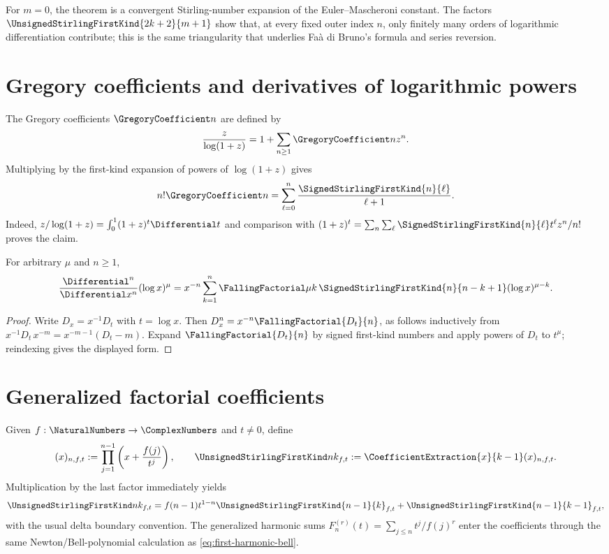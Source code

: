\documentclass[11pt,a4paper,oneside,openany]{book}
\theoremstyle{definition}
\theoremstyle{remark}
\begin{document}
For $m=0$, the theorem is a convergent Stirling-number expansion of the
Euler--Mascheroni constant.  The factors
$\UnsignedStirlingFirstKind{2k+2}{m+1}$ show that, at every fixed outer index $n$, only finitely many
orders of logarithmic differentiation contribute; this is the same triangularity
that underlies Fa\`a di Bruno's formula and series reversion.
\section{Gregory coefficients and derivatives of logarithmic powers}
The Gregory coefficients $\GregoryCoefficient n$ are defined by
\[
 \frac{z}{\log(1+z)}=1+\sum_{n\ge1}\GregoryCoefficient n z^n.
\]
Multiplying by the first-kind expansion of powers of $\log(1+z)$ gives
\begin{equation}\label{eq:gregory-stirling}
 n!\GregoryCoefficient n=\sum_{\ell=0}^n\frac{\SignedStirlingFirstKind{n}{\ell}}{\ell+1}.
\end{equation}
Indeed,
$z/\log(1+z)=\int_0^1(1+z)^t\Differential t$ and comparison with
$(1+z)^t=\sum_n\sum_\ell \SignedStirlingFirstKind{n}{\ell}t^\ell z^n/n!$ proves the claim.

For arbitrary $\mu$ and $n\ge1$,
\begin{equation}\label{eq:log-power-derivative}
 \frac{\Differential^n}{\Differential x^n}(\log x)^\mu
 =x^{-n}\sum_{k=1}^n\FallingFactorial\mu k\,\SignedStirlingFirstKind{n}{n-k+1}(\log x)^{\mu-k}.
\end{equation}
\begin{proof}
Write $D_x=x^{-1}D_t$ with $t=\log x$.  Then
$D_x^n=x^{-n}\FallingFactorial{D_t}{n}$, as follows inductively from
$x^{-1}D_t\,x^{-m}=x^{-m-1}(D_t-m)$.  Expand
$\FallingFactorial{D_t}{n}$ by signed first-kind numbers and apply powers of $D_t$ to
$t^\mu$; reindexing gives the displayed form.
\end{proof}

\section{Generalized factorial coefficients}
Given $f:\NaturalNumbers\to\ComplexNumbers$ and $t\ne0$, define
\begin{equation}\label{eq:generalized-factorial-product}
 (x)_{n,f,t}:=\prod_{j=1}^{n-1}\left(x+\frac{f(j)}{t^j}\right),
 \qquad
 \UnsignedStirlingFirstKind nk_{f,t}:=\CoefficientExtraction{x}{k-1}(x)_{n,f,t}.
\end{equation}
Multiplication by the last factor immediately yields
\begin{equation}\label{eq:generalized-first-recurrence}
 \UnsignedStirlingFirstKind nk_{f,t}
 =f(n-1)t^{1-n}\UnsignedStirlingFirstKind{n-1}{k}_{f,t}
  +\UnsignedStirlingFirstKind{n-1}{k-1}_{f,t},
\end{equation}
with the usual delta boundary convention.  The generalized harmonic sums
$F_n^{(r)}(t)=\sum_{j\le n}t^j/f(j)^r$ enter the coefficients through the same
Newton/Bell-polynomial calculation as \cref{eq:first-harmonic-bell}.
\end{document}
